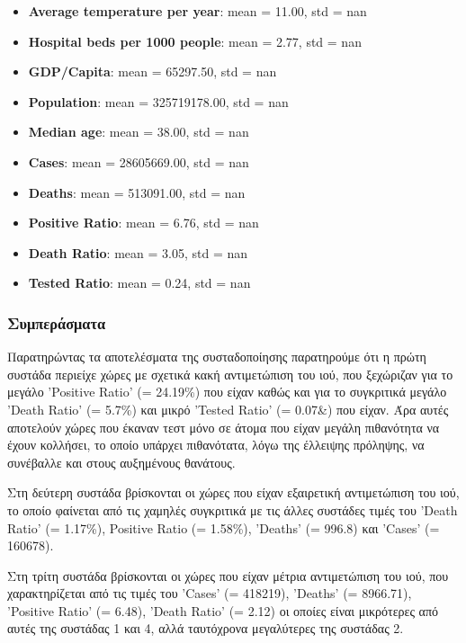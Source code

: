 \documentclass[12pt,a4paper]{article}
\begin{document}
\begin{itemize}
\begin{itemize}
            \item \textbf{Average temperature per year}: mean = 11.00, std = nan
            \item \textbf{Hospital beds per 1000 people}: mean = 2.77, std = nan
            \item \textbf{GDP/Capita}: mean = 65297.50, std = nan
            \item \textbf{Population}: mean = 325719178.00, std = nan
            \item \textbf{Median age}: mean = 38.00, std = nan
            \item \textbf{Cases}: mean = 28605669.00, std = nan
            \item \textbf{Deaths}: mean = 513091.00, std = nan
            \item \textbf{Positive Ratio}: mean = 6.76, std = nan
            \item \textbf{Death Ratio}: mean = 3.05, std = nan
            \item \textbf{Tested Ratio}: mean = 0.24, std = nan

        \end{itemize}
\end{itemize}

\subsubsection{Συμπεράσματα}

Παρατηρώντας τα αποτελέσματα της συσταδοποίησης παρατηρούμε ότι η πρώτη συστάδα περιείχε χώρες με σχετικά κακή αντιμετώπιση του ιού, που ξεχώριζαν για το μεγάλο 'Positive Ratio' (= 24.19\%) που είχαν καθώς και για το συγκριτικά μεγάλο 'Death Ratio' (= 5.7\%) και μικρό 'Tested Ratio' (= 0.07\&) που είχαν. Άρα αυτές αποτελούν χώρες που έκαναν τεστ μόνο σε άτομα που είχαν μεγάλη πιθανότητα να έχουν κολλήσει, το οποίο υπάρχει πιθανότατα, λόγω της έλλειψης πρόληψης, να συνέβαλλε και στους αυξημένους θανάτους.

Στη δεύτερη συστάδα βρίσκονται οι χώρες που είχαν εξαιρετική αντιμετώπιση του ιού, το οποίο φαίνεται από τις χαμηλές συγκριτικά με τις άλλες συστάδες τιμές του 'Death Ratio' (= 1.17\%), Positive Ratio (= 1.58\%), 'Deaths' (= 996.8) και 'Cases' (= 160678).

Στη τρίτη συστάδα βρίσκονται οι χώρες που είχαν μέτρια αντιμετώπιση του ιού, που χαρακτηρίζεται από τις τιμές του 'Cases' (= 418219), 'Deaths' (= 8966.71), 'Positive Ratio' (= 6.48), 'Death Ratio' (= 2.12) οι οποίες είναι μικρότερες από αυτές της συστάδας 1 και 4, αλλά ταυτόχρονα μεγαλύτερες της συστάδας 2.
\end{document}
